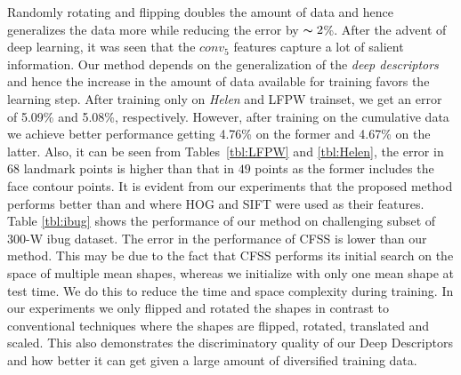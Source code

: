\documentclass[10pt,twocolumn,letterpaper]{article}
\begin{document}
Randomly rotating and flipping doubles the amount of data and hence generalizes the data more while reducing the error by $\thicksim2$\%. After the advent of deep learning, it was seen that the $conv_5$ features capture a lot of salient information. Our method depends on the generalization of the \textit{deep descriptors} and hence the increase in the amount of data available for training favors the learning step. After training only on \textit{Helen} and LFPW trainset, we get an error of 5.09\% and 5.08\%, respectively.  However, after training on the cumulative data we achieve better performance getting 4.76\% on the former and 4.67\% on the latter.  Also, it can be seen from Tables~\ref{tbl:LFPW} and \ref{tbl:Helen}, the error in $68$ landmark points is higher than that in $49$ points as the former includes the face contour points. It is evident from our experiments that the proposed method performs better than \cite{AFW_dataset_CVPR2012} and \cite{XiongD13} where HOG and SIFT  were used as their features. Table \ref{tbl:ibug} shows the performance of our method on challenging subset of 300-W ibug dataset. The error in the performance of CFSS \cite{Zhu_2015_CVPR} is lower than our method.  This may be due to the fact that  CFSS performs its initial search on the space of multiple mean shapes, whereas we initialize with only one mean shape at test time. We do this to reduce the time and space complexity during training. In our experiments we only flipped and rotated the shapes in contrast to conventional techniques where the shapes are flipped, rotated, translated and scaled. This also demonstrates the discriminatory quality of our Deep Descriptors and how better it can get given a large amount of diversified training data.   
\end{document}
